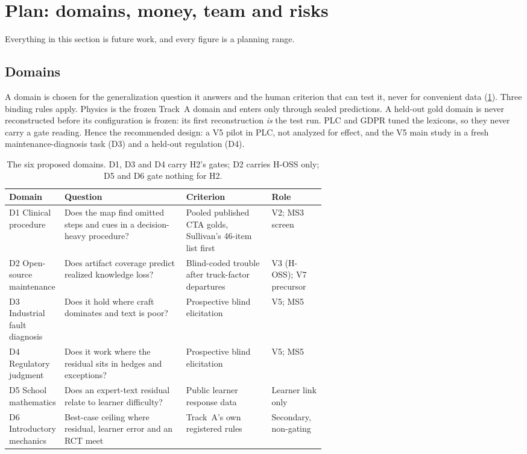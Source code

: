 \section{Plan: domains, money, team and risks}\label{sec:plan}

\evfut{} Everything in this section is future work, and every figure is a planning range.

\subsection{Domains}

A domain is chosen for the generalization question it answers and the human criterion that can test it,
never for convenient data (\cref{tab:domains}). Three binding rules apply. Physics is the frozen Track~A
domain and enters only through sealed predictions. A held-out gold domain is never reconstructed before
its configuration is frozen: its first reconstruction \emph{is} the test run. PLC and GDPR tuned the
lexicons, so they never carry a gate reading. Hence the recommended design: a V5 pilot in PLC, not
analyzed for effect, and the V5 main study in a fresh maintenance-diagnosis task (D3) and a held-out
regulation (D4).

\begin{table}[htbp]
  \centering\footnotesize
  \caption{The six proposed domains. D1, D3 and D4 carry H2's gates; D2 carries H-OSS only; D5 and D6
    gate nothing for H2.}
  \label{tab:domains}
  \begin{tabularx}{\linewidth}{@{}>{\raggedright\arraybackslash}p{0.17\linewidth}
      >{\raggedright\arraybackslash}X>{\raggedright\arraybackslash}p{0.27\linewidth}
      >{\raggedright\arraybackslash}p{0.17\linewidth}@{}}
    \toprule
    Domain & Question & Criterion & Role \\
    \midrule
    D1 Clinical procedure & Does the map find omitted steps and cues in a decision-heavy procedure? &
      Pooled published CTA golds, Sullivan's 46-item list first & V2; MS3 screen \\
    D2 Open-source maintenance & Does artifact coverage predict realized knowledge loss? & Blind-coded
      trouble after truck-factor departures & V3 (H-OSS); V7 precursor \\
    D3 Industrial fault diagnosis & Does it hold where craft dominates and text is poor? & Prospective
      blind elicitation & V5; MS5 \\
    D4 Regulatory judgment & Does it work where the residual sits in hedges and exceptions? &
      Prospective blind elicitation & V5; MS5 \\
    D5 School mathematics & Does an expert-text residual relate to learner difficulty? & Public learner
      response data & Learner link only \\
    D6 Introductory mechanics & Best-case ceiling where residual, learner error and an RCT meet & Track~A's
      own registered rules & Secondary, non-gating \\
    \bottomrule
  \end{tabularx}
\end{table}

